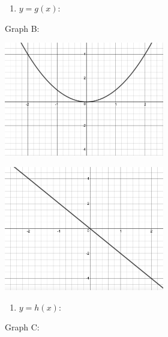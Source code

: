 \documentclass{ximera}
\begin{document}
\begin{center}
\begin{multicols}{2}
\begin{enumerate}
\item $y = g(x)$:

\setcounter{HW}{\value{enumi}}
\end{enumerate}

Graph B:

\end{multicols}

\begin{multicols}{2}

\includegraphics[width=2.75in]{./IntroductiontoDerivativesGraphics/MatchFunc02.jpeg}

\includegraphics[width=2.75in]{./IntroductiontoDerivativesGraphics/MatchDeriv01.jpeg}

\end{multicols}


\begin{multicols}{2}

\begin{enumerate}
\setcounter{enumi}{\value{HW}}

\item \label{MatchFcnDerivative1last} $y = h(x)$:

\setcounter{HW}{\value{enumi}}
\end{enumerate}


Graph C:

\end{multicols}




\begin{multicols}{2}


\end{multicols}
\end{center}
\end{document}
